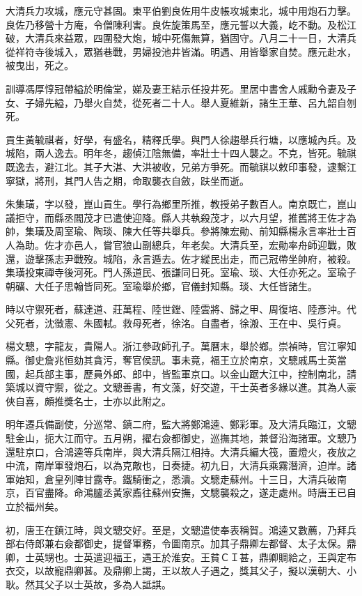 \begin{pinyinscope}
{{大清兵力攻城，應元守甚固。東平伯劉良佐用牛皮帳攻城東北，城中用炮石力擊。良佐乃移營十方庵，令僧陳利害。良佐旋策馬至，應元誓以大義，屹不動。及松江破，大清兵來益眾，四圍發大炮，城中死傷無算，猶固守。八月二十一日，大清兵從祥符寺後城入，眾猶巷戰，男婦投池井皆滿。明遇、用皆舉家自焚。應元赴水，被曳出，死之。

訓導馮厚惇冠帶縊於明倫堂，娣及妻王結示任投井死。里居中書舍人戚勳令妻及子女、子婦先縊，乃舉火自焚，從死者二十人。舉人夏維新，諸生王華、呂九韶自刎死。

貢生黃毓祺者，好學，有盛名，精釋氏學。與門人徐趨舉兵行塘，以應城內兵。及城陷，兩人逸去。明年冬，趨偵江陰無備，率壯士十四人襲之。不克，皆死。毓祺既逸去，避江北。其子大湛、大洪被收，兄弟方爭死。而毓祺以敕印事發，逮繫江寧獄，將刑，其門人告之期，命取襲衣自斂，趺坐而逝。

朱集璜，字以發，崑山貢生。學行為鄉里所推，教授弟子數百人。南京既亡，崑山議拒守，而縣丞閻茂才已遣使迎降。縣人共執殺茂才，以六月望，推舊將王佐才為帥，集璜及周室瑜、陶琰、陳大任等共舉兵。參將陳宏勛、前知縣楊永言率壯士百人為助。佐才亦邑人，嘗官狼山副總兵，年老矣。大清兵至，宏勛率舟師迎戰，敗還，遊擊孫志尹戰歿。城陷，永言遁去。佐才縱民出走，而己冠帶坐帥府，被殺。集璜投東禪寺後河死。門人孫道民、張謙同日死。室瑜、琰、大任亦死之。室瑜子朝礦、大任子思翰皆同死。室瑜舉於鄉，官儀封知縣。琰、大任皆諸生。

時以守禦死者，蘇達道、莊萬程、陸世鏜、陸雲將、歸之甲、周復培、陸彥沖。代父死者，沈徵憲、朱國軾。救母死者，徐洺。自盡者，徐溵、王在中、吳行貞。

楊文驄，字龍友，貴陽人。浙江參政師孔子。萬曆末，舉於鄉。崇禎時，官江寧知縣。御史詹兆恒劾其貪污，奪官侯訊。事未竟，福王立於南京，文驄戚馬士英當國，起兵部主事，歷員外郎、郎中，皆監軍京口。以金山踞大江中，控制南北，請築城以資守禦，從之。文驄善書，有文藻，好交遊，干士英者多緣以進。其為人豪俠自喜，頗推獎名士，士亦以此附之。

明年遷兵備副使，分巡常、鎮二府，監大將鄭鴻逵、鄭彩軍。及大清兵臨江，文驄駐金山，扼大江而守。五月朔，擢右僉都御史，巡撫其地，兼督沿海諸軍。文驄乃還駐京口，合鴻逵等兵南岸，與大清兵隔江相持。大清兵編大筏，置燈火，夜放之中流，南岸軍發炮石，以為克敵也，日奏捷。初九日，大清兵乘霧潛濟，迫岸。諸軍始知，倉皇列陣甘露寺。鐵騎衝之，悉潰。文驄走蘇州。十三日，大清兵破南京，百官盡降。命鴻臚丞黃家鼒往蘇州安撫，文驄襲殺之，遂走處州。時唐王已自立於福州矣。

初，唐王在鎮江時，與文驄交好。至是，文驄遣使奉表稱賀。鴻逵又數薦，乃拜兵部右侍郎兼右僉都御史，提督軍務，令圖南京。加其子鼎卿左都督、太子太保。鼎卿，士英甥也。士英遣迎福王，遇王於淮安。王貧ＣＩ甚，鼎卿賙給之，王與定布衣交，以故寵鼎卿甚。及鼎卿上謁，王以故人子遇之，獎其父子，擬以漢朝大、小耿。然其父子以士英故，多為人詆諆。

}}
\end{pinyinscope}
